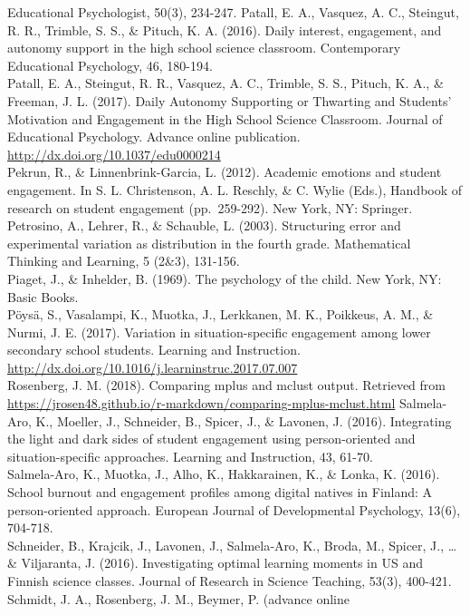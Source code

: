 \documentclass[]{msu-thesis}
\theoremstyle{definition}
\theoremstyle{definition}
\theoremstyle{definition}
\theoremstyle{remark}
\begin{document}
Educational Psychologist, 50(3), 234-247. Patall, E. A., Vasquez, A. C.,
Steingut, R. R., Trimble, S. S., \& Pituch, K. A. (2016). Daily
interest, engagement, and autonomy support in the high school science
classroom. Contemporary Educational Psychology, 46, 180-194.\\
Patall, E. A., Steingut, R. R., Vasquez, A. C., Trimble, S. S., Pituch,
K. A., \& Freeman, J. L. (2017). Daily Autonomy Supporting or Thwarting
and Students' Motivation and Engagement in the High School Science
Classroom. Journal of Educational Psychology. Advance online
publication. \url{http://dx.doi.org/10.1037/edu0000214}\\
Pekrun, R., \& Linnenbrink-Garcia, L. (2012). Academic emotions and
student engagement. In S. L. Christenson, A. L. Reschly, \& C. Wylie
(Eds.), Handbook of research on student engagement (pp.~259-292). New
York, NY: Springer. Petrosino, A., Lehrer, R., \& Schauble, L. (2003).
Structuring error and experimental variation as distribution in the
fourth grade. Mathematical Thinking and Learning, 5 (2\&3), 131-156.\\
Piaget, J., \& Inhelder, B. (1969). The psychology of the child. New
York, NY: Basic Books.\\
Pöysä, S., Vasalampi, K., Muotka, J., Lerkkanen, M. K., Poikkeus, A. M.,
\& Nurmi, J. E. (2017). Variation in situation-specific engagement among
lower secondary school students. Learning and Instruction.
\url{http://dx.doi.org/10.1016/j.learninstruc.2017.07.007}\\
Rosenberg, J. M. (2018). Comparing mplus and mclust output. Retrieved
from
\url{https://jrosen48.github.io/r-markdown/comparing-mplus-mclust.html}
Salmela-Aro, K., Moeller, J., Schneider, B., Spicer, J., \& Lavonen, J.
(2016). Integrating the light and dark sides of student engagement using
person-oriented and situation-specific approaches. Learning and
Instruction, 43, 61-70.\\
Salmela-Aro, K., Muotka, J., Alho, K., Hakkarainen, K., \& Lonka, K.
(2016). School burnout and engagement profiles among digital natives in
Finland: A person-oriented approach. European Journal of Developmental
Psychology, 13(6), 704-718.\\
Schneider, B., Krajcik, J., Lavonen, J., Salmela‐Aro, K., Broda, M.,
Spicer, J., \ldots{} \& Viljaranta, J. (2016). Investigating optimal
learning moments in US and Finnish science classes. Journal of Research
in Science Teaching, 53(3), 400-421.\\
Schmidt, J. A., Rosenberg, J. M., Beymer, P. (advance online
\end{document}

